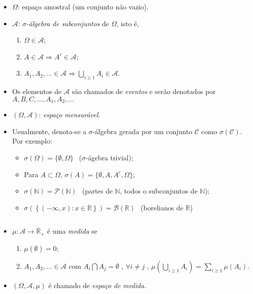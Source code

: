 \documentclass[
]{book}
\providecommand{\tightlist}{%
  \setlength{\itemsep}{0pt}\setlength{\parskip}{0pt}}
\begin{document}
\begin{itemize}
\item
  \(\Omega\): espaço amostral (um conjunto não vazio).
\item
  \(\mathcal{A}\): \emph{\(\sigma\)-álgebra de subconjuntos} de \(\Omega\), isto é,

  \begin{enumerate}
  \def\labelenumi{\arabic{enumi}.}
  \tightlist
  \item
    \(\Omega \in \mathcal{A}\);
  \item
    \(A \in \mathcal{A} \Longrightarrow A^{c} \in \mathcal{A}\);
  \item
    \(\displaystyle A_1, A_2, \ldots \in \mathcal{A} \Longrightarrow \bigcup_{i\geq1} A_i \in \mathcal{A}\).
  \end{enumerate}
\item
  Os elementos de \(\mathcal{A}\) são chamados de \emph{eventos} e serão denotados por \(A, B, C, \ldots, A_1, A_2, \ldots\)
\item
  \((\Omega, \mathcal{A})\): \emph{espaço mensurável}.
\item
  Usualmente, denota-se a \(\sigma\)-álgebra gerada por um conjunto \(\mathcal{C}\) como \(\sigma(\mathcal{C})\). Por exemplo:

  \begin{itemize}
  \tightlist
  \item
    \(\sigma(\Omega) = \{\emptyset,\Omega\}~~\) (\(\sigma\)-ágebra trivial);
  \item
    Para \(A \subset \Omega\), \(\sigma(A) = \{\emptyset, A, A^c, \Omega\}\);
  \item
    \(\sigma(\mathbb{N}) = \mathcal{P}(\mathbb{N})~~\) (partes de \(\mathbb{N}\), todos o subconjuntos de \(\mathbb{N}\));
  \item
    \(\sigma\left(\left\{(-\infty,x): x \in \mathbb{R}\right\}\right) = \mathcal{B}\left(\mathbb{R}\right)~~\) (borelianos de \(\mathbb{R}\))
  \end{itemize}
\end{itemize}

\(~\)

\begin{itemize}
\tightlist
\item
  \(\mu: \mathcal{A} \longrightarrow \bar{\mathbb{R}}_+\) é uma \emph{medida} se

  \begin{enumerate}
  \def\labelenumi{\arabic{enumi}.}
  \tightlist
  \item
    \(\mu(\emptyset) = 0\);
  \item
    \(\displaystyle A_1, A_2, \ldots \in \mathcal{A}\) com \(A_i \bigcap A_j = \emptyset\) , \(\forall i \neq j\) , \(\displaystyle \mu\left(\bigcup_{i \geq 1} A_i\right) = \sum_{i \geq 1} \mu\left(A_i\right)\).
  \end{enumerate}
\item
  \((\Omega,\mathcal{A}, \mu)\) é chamado de \emph{espaço de medida}.
\end{itemize}
\end{document}
